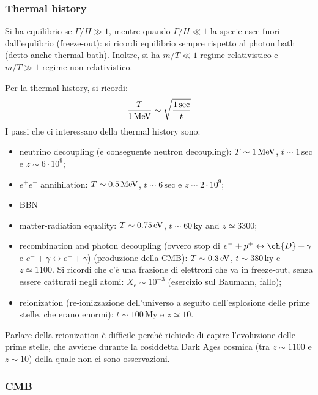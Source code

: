 \subsubsection{Thermal history}

Si ha equilibrio se $ \Gamma / H \gg 1 $, mentre quando $ \Gamma / H \ll 1 $ la specie esce fuori dall'equlibrio (freeze-out): si ricordi equilibrio sempre rispetto al photon bath (detto anche thermal bath). Inoltre, si ha $ m / T \ll 1 $ regime relativistico e $ m / T \gg 1 $ regime non-relativistico.

Per la thermal history, si ricordi:
\begin{equation*}
  \frac{T}{1 \,\mathrm{MeV}} \sim \sqrt{\frac{1 \,\text{sec}}{t}}
\end{equation*}
I passi che ci interessano della thermal history sono:
\begin{itemize}
  \item neutrino decoupling (e conseguente neutron decoupling): $ T \sim 1 \,\mathrm{MeV} $, $ t \sim 1 \,\text{sec} $ e $ z \sim 6 \cdot 10^9 $;
  \item $ e^+ e^- $ annihilation: $ T \sim 0.5 \,\mathrm{MeV} $, $ t \sim 6 \,\text{sec} $ e $ z \sim 2 \cdot 10^9 $;
  \item BBN
  \item matter-radiation equality: $ T \sim 0.75 \,\mathrm{eV} $, $ t \sim 60 \,\text{ky} $ and $ z \simeq 3300 $;
  \item recombination and photon decoupling (ovvero stop di $ e^- + p^+ \leftrightarrow \ch{D} + \gamma $ e $ e^- + \gamma \leftrightarrow e^- + \gamma $) (produzione della CMB): $ T \sim 0.3 \,\mathrm{eV} $, $ t \sim 380 \,\text{ky} $ e $ z \simeq 1100 $. Si ricordi che c'è una frazione di elettroni che va in freeze-out, senza essere catturati negli atomi: $ X_e \sim 10^{-3} $ (esercizio sul Baumann, fallo);
  \item reionization (re-ionizzazione dell'universo a seguito dell'esplosione delle prime stelle, che erano enormi): $ t \sim 100 \,\text{My} $ e $ z \simeq 10 $.
\end{itemize}

Parlare della reionization è difficile perché richiede di capire l'evoluzione delle prime stelle, che avviene durante la cosiddetta Dark Ages cosmica (tra $ z \sim 1100 $ e $ z \sim 10 $) della quale non ci sono osservazioni.

\subsubsection{CMB}

